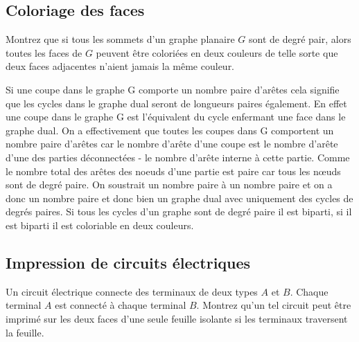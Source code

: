 \subsection{Coloriage des faces}
Montrez que si tous les sommets d’un graphe planaire $G$ sont de degré pair, alors toutes les faces de $G$ peuvent être coloriées en deux couleurs de telle sorte que deux faces adjacentes n’aient jamais la même couleur.

\begin{solution}
Si une coupe dans le graphe G comporte un nombre paire d'arêtes cela signifie que les cycles dans le graphe dual seront de longueurs paires également. En effet une coupe dans le graphe G est l'équivalent du cycle enfermant une face dans le graphe dual. On a effectivement que toutes les coupes dans G comportent un nombre paire d'arêtes car le nombre d'arête d'une coupe est le nombre d'arête d'une des parties déconnectées - le nombre d'arête interne à cette partie. Comme le nombre total des arêtes des noeuds d'une partie est paire car tous les nœuds sont de degré paire. On soustrait un nombre paire à un nombre paire et on a donc un nombre paire et donc bien un graphe dual avec uniquement des cycles de degrés paires. Si tous les cycles d'un graphe sont de degré paire il est biparti, si il est biparti il est coloriable en deux couleurs.

\end{solution}

\subsection{Impression de circuits électriques}
Un circuit électrique connecte des terminaux de deux types $A$ et $B$. Chaque terminal $A$ est connecté à chaque terminal $B$. Montrez qu’un tel circuit peut être imprimé sur les deux faces d’une seule feuille isolante si les terminaux traversent la feuille.

\begin{solution}
  \nosolution
\end{solution}
